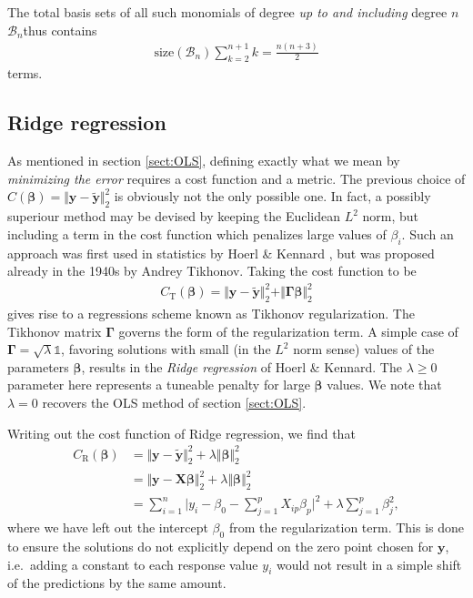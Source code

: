 \documentclass[a4paper, twocolumn]{article}
\begin{document}
The total basis sets of all such monomials of degree \textit{up to and including} degree $n$\textemdash $\mathcal{B}_n$\textemdash thus contains 
\begin{align}
\text{size}(\mathcal{B}_n) \sum_{k=2}^{n+1}k = \frac{n(n+3)}{2}
\end{align}
terms. 
\subsection{Ridge regression \label{sect:ridge}}
As mentioned in section \ref{sect:OLS}, defining exactly what we mean by \textit{minimizing the error} requires a cost function and a metric. The previous choice of $C(\bm\beta)=\Vert \mathbf{y}-\tilde{\mathbf{y}}\Vert_2^2$ is obviously not the only possible one. In fact, a possibly superiour method may be devised by keeping the Euclidean $L^2$ norm, but including a term in the cost function which penalizes large values of $\beta_i$. Such an approach was first used in statistics by Hoerl \& Kennard \autocite{hoerl1970ridge}, but was proposed already in the 1940s by Andrey Tikhonov\autocite{tikhonov1943stability}. Taking the cost function to be 
\begin{align}
C_\text{T}(\bm\beta) = \Vert \mathbf{y}-\tilde{\mathbf{y}}\Vert_2^2 + \Vert \bm\Gamma \bm\beta \Vert_2^2
\end{align}
gives rise to a regressions scheme known as Tikhonov regularization. The Tikhonov matrix $\bm\Gamma$ governs the form of the regularization term. A simple case of $\bm\Gamma=\sqrt{\lambda} \mathds{1}$, favoring solutions with small (in the $L^2$ norm sense) values of the parameters $\bm\beta$, results in the \textit{Ridge regression} of Hoerl \& Kennard. The $\lambda\ge 0$ parameter here represents a tuneable penalty for large $\bm\beta$ values. We note that $\lambda=0$ recovers the OLS method of section \ref{sect:OLS}.

Writing out the cost function of Ridge regression, we find that 
\begin{align}
C_\text{R}(\bm\beta) &= \Vert \mathbf{y}-\tilde{\mathbf{y}}\Vert_2^2 + \lambda \Vert \bm\beta \Vert_2^2 \nonumber \\
%
&= \Vert \mathbf{y} - \mathbf{X}\bm\beta\Vert_2^2 + \lambda \Vert \bm\beta \Vert_2^2 \nonumber \\ 
&= \sum_{i=1}^n \Big| y_i - \beta_0 - \sum_{j=1}^p X_{ip} \beta_p \Big|^2 + \lambda \sum_{j=1}^p \beta_j^2,
\end{align}
where we have left out the intercept $\beta_0$ from the regularization term. This is done to ensure the solutions do not explicitly depend on the zero point chosen for $\mathbf{y}$, i.e.\ adding a constant to each response value $y_i$ would not result in a simple shift of the predictions by the same amount\autocite{trevor2009elements}. 
\end{document}
